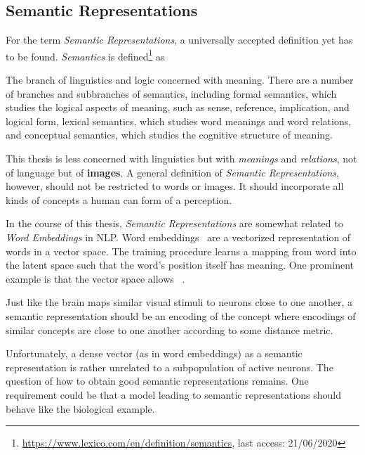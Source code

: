 \subsection{Semantic Representations}\label{subsec:semantic-representations}
For the term \textit{Semantic Representations}, a universally accepted definition yet has to be found.
\textit{Semantics} is defined\footnote{\href{https://www.lexico.com/en/definition/semantics}{https://www.lexico.com/en/definition/semantics}, last access: 21/06/2020} as
\begin{displayquote}
    The branch of linguistics and logic concerned with meaning. There are a number of branches and subbranches of semantics, including formal semantics, which studies the logical aspects of meaning, such as sense, reference, implication, and logical form, lexical semantics, which studies word meanings and word relations, and conceptual semantics, which studies the cognitive structure of meaning.
\end{displayquote}
This thesis is less concerned with linguistics but with \textit{meanings} and \textit{relations}, not of language but of \textbf{images}.
A general definition of \textit{Semantic Representations}, however, should not be restricted to words or images.
It should incorporate all kinds of concepts a human can form of a perception.

In the course of this thesis, \textit{Semantic Representations} are somewhat related to \textit{Word Embeddings} in \ac{NLP}.
Word embeddings~\citep{mikolov2013efficient} are a vectorized representation of words in a vector space.
The training procedure learns a mapping from word into the latent space such that the word's position itself has meaning.
One prominent example is that the vector space allows ~\citep{mikolov2013efficient}.

Just like the brain maps similar visual stimuli to neurons close to one another, a semantic representation should be an encoding of the concept where encodings of similar concepts are close to one another according to some distance metric.

Unfortunately, a dense vector (as in word embeddings) as a semantic representation is rather unrelated to a subpopulation of active neurons.
The question of how to obtain good semantic representations remains.
One requirement could be that a model leading to semantic representations should behave like the biological example.

